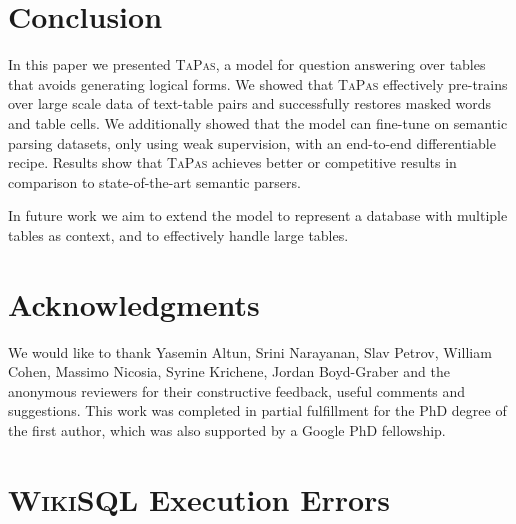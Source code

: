 \documentclass[11pt,a4paper]{article}
\newcommand\wikisql{\textsc{WikiSQL}\xspace}
\newcommand{\ours}{\textsc{TaPas}\xspace}
\begin{document}
 \section{Conclusion}

In this paper we presented \ours, a model for question answering over tables that avoids generating logical forms. We showed that \ours effectively pre-trains over large scale data of text-table pairs and successfully restores masked words and table cells. We additionally showed that the model can fine-tune on semantic parsing datasets, only using weak supervision, with an end-to-end differentiable recipe. Results show that \ours achieves better or competitive results in comparison to state-of-the-art semantic parsers.

In future work we aim to extend the model to represent a database with multiple tables as context, and to effectively handle large tables.
 \section{Acknowledgments}

We would like to thank Yasemin Altun, Srini Narayanan, Slav Petrov, William Cohen, Massimo Nicosia, Syrine Krichene, Jordan Boyd-Graber and the anonymous reviewers for their constructive feedback, useful comments and suggestions. This work was completed in partial fulfillment for the PhD degree of the first author, which was also supported by a Google PhD fellowship. 



\newpage
\newpage

\newpage

\appendix

\section{\wikisql Execution Errors}
\label{sec:wikisql_diffs}
\end{document}
